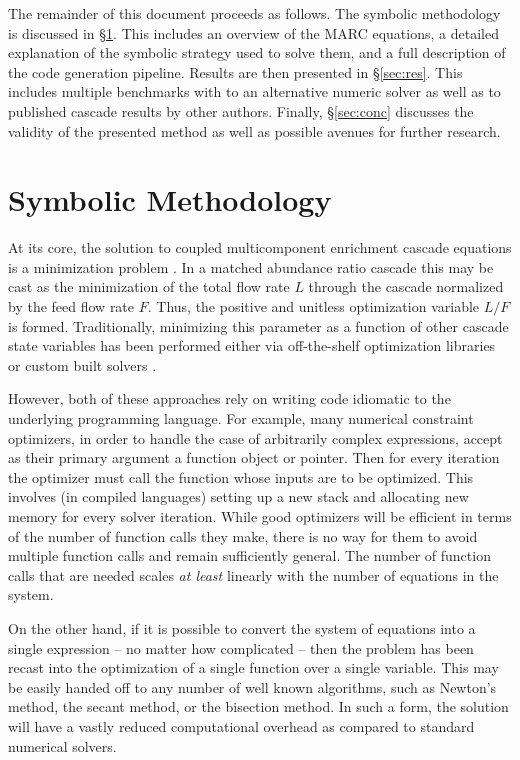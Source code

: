 \documentclass{ansconf}
\begin{document}
The remainder of this document proceeds as follows.  The symbolic methodology 
is discussed in \S\ref{sec:meth}.  This includes an overview of the
MARC equations, a detailed explanation of the symbolic strategy used to solve 
them, and a full description of the code generation pipeline.
Results are then presented in \S\ref{sec:res}.  This includes multiple benchmarks
with to an alternative numeric solver as well as to published cascade results by other 
authors.  Finally, \S\ref{sec:conc} discusses the validity of the presented method
as well as possible avenues for further research.

\section{Symbolic Methodology}
\label{sec:meth}
At its core, the solution to coupled multicomponent enrichment cascade equations is
a minimization problem \cite{Wood1999}.  In a matched abundance ratio 
\cite{DelaGarza1969} cascade this may be cast as the minimization of 
the total flow rate $L$ through the cascade normalized by the feed flow rate $F$.  
Thus, the positive and unitless optimization variable $L/F$ is formed.  Traditionally, 
minimizing this parameter as a function of other cascade state variables has been 
performed either via off-the-shelf optimization libraries 
\cite{doi:10.1080/01496391003793884} or custom built solvers \cite{PyNE2012}.

However, both of these approaches rely on writing code idiomatic to the underlying 
programming language.  For example, many numerical constraint optimizers, in order 
to handle the case of arbitrarily complex expressions, accept as their primary 
argument a function object or pointer.  Then for every iteration the optimizer must 
call the function whose inputs are to be optimized.  This involves (in compiled 
languages) setting up a new stack and allocating new memory for every solver 
iteration.  While good 
optimizers will be efficient in terms of the number of function calls they make, 
there is no way for them to avoid multiple function calls and remain sufficiently 
general. The number of function calls that are needed scales \emph{at least} linearly 
with the number of equations in the system.

On the other hand, if it is possible to convert the system of equations 
into a single expression -- no matter how complicated -- then the problem has been 
recast into the optimization of a single function over a single variable.   This 
may be easily handed off to any number of well known algorithms, such as Newton's
method, the secant method, or the bisection method.  In such a form, the solution 
will have a vastly reduced computational overhead as compared to standard 
numerical solvers. 
\end{document}
